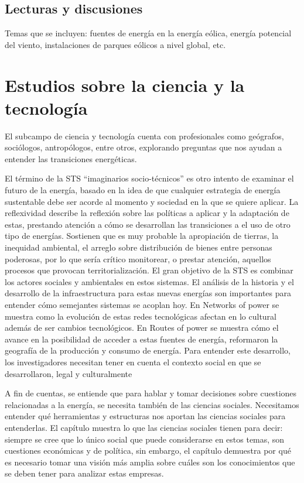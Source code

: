 \documentclass{article}
\begin{document}
\subsection{Lecturas y discusiones}
Temas que se incluyen: fuentes de energía en la energía eólica, energía potencial del viento, instalaciones de parques eólicos a nivel global, etc.


\section{Estudios sobre la ciencia y la tecnología}


El subcampo de ciencia y tecnología cuenta con profesionales como geógrafos, sociólogos, antropólogos, entre otros, explorando preguntas que nos ayudan a entender las transiciones energéticas.

El término de la STS “imaginarios socio-técnicos” es otro intento de examinar el futuro de la energía, basado en la idea de que cualquier estrategia de energía sustentable debe ser acorde al momento y sociedad en la que se quiere aplicar. La reflexividad describe la reflexión sobre las políticas a aplicar y la adaptación de estas, prestando atención a cómo se desarrollan las transiciones a el uso de otro tipo de energías. Sostienen que es muy probable la apropiación de tierras, la inequidad ambiental, el arreglo sobre distribución de bienes entre personas poderosas, por lo que sería crítico monitorear, o prestar atención, aquellos procesos que provocan territorialización. El gran objetivo de la STS es combinar los actores sociales y ambientales en estos sistemas.
El análisis de la historia y el desarrollo de la infraestructura para estas nuevas energías son importantes para entender cómo semejantes sistemas se acoplan hoy. En Networks of power se muestra como la evolución de estas redes tecnológicas afectan en lo cultural además de ser cambios tecnológicos. En Routes of power se muestra cómo el avance en la posibilidad de acceder a estas fuentes de energía, reformaron la geografía de la producción y consumo de energía. Para entender este desarrollo, los investigadores necesitan tener en cuenta el contexto social en que se desarrollaron, legal y culturalmente

A fin de cuentas, se entiende que para hablar y tomar decisiones sobre cuestiones relacionadas a la energía, se necesita también de las ciencias sociales. Necesitamos entender qué herramientas y estructuras nos aportan las ciencias sociales para entenderlas. El capítulo muestra lo que las ciencias sociales tienen para decir: siempre se cree que lo único social que puede considerarse en estos temas, son cuestiones económicas y de política, sin embargo, el capítulo demuestra por qué es necesario tomar una visión más amplia sobre cuáles son los conocimientos que se deben tener para analizar estas empresas.
\end{document}
